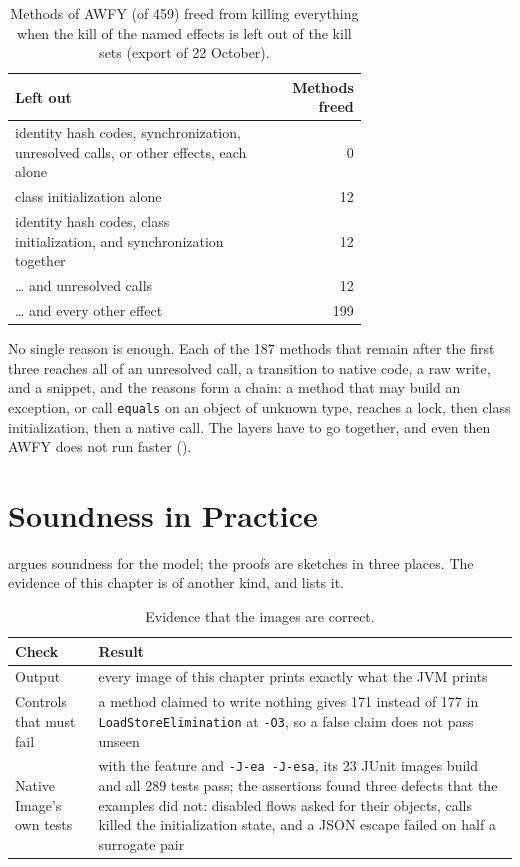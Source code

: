 \begin{table}[t]
    \centering
    \caption{Methods of AWFY (of 459) freed from killing everything when the kill of the named effects is left out of the
    kill sets (export of 22 October).}
    \label{tab:eval-blockers}
    \footnotesize
    \begin{tabular}{p{0.7\linewidth}r}
        \toprule
        Left out & Methods freed \\
        \midrule
        identity hash codes, synchronization, unresolved calls, or other effects, each alone & 0 \\
        class initialization alone & 12 \\
        identity hash codes, class initialization, and synchronization together & 12 \\
        \dots{} and unresolved calls & 12 \\
        \dots{} and every other effect & 199 \\
        \bottomrule
    \end{tabular}
\end{table}

No single reason is enough. Each of the 187 methods that remain after the first three reaches all of an unresolved call, a
transition to native code, a raw write, and a snippet, and the reasons form a chain: a method that may build an exception, or
call \texttt{equals} on an object of unknown type, reaches a lock, then class initialization, then a native call. The layers have
to go together, and even then AWFY does not run faster ().

\section{Soundness in Practice}\label{sec:eval-soundness}

 argues soundness for the model; the proofs are sketches in three places. The evidence of this chapter is of
another kind, and  lists it.

\begin{table}[t]
    \centering
    \caption{Evidence that the images are correct.}
    \label{tab:eval-checks}
    \footnotesize
    \begin{tabular}{p{3.2cm}p{9.0cm}}
        \toprule
        Check & Result \\
        \midrule
        Output                    & every image of this chapter prints exactly what the JVM prints \\
        Controls that must fail   & a method claimed to write nothing gives 171 instead of 177 in \texttt{LoadStoreElimination} at \texttt{-O3}, so a false claim does not pass unseen \\
        Native Image's own tests  & with the feature and \texttt{-J-ea -J-esa}, its 23 JUnit images build and all 289 tests pass; the assertions found three defects that the examples did not: disabled flows asked for their objects, calls killed the initialization state, and a JSON escape failed on half a surrogate pair \\
        \bottomrule
    \end{tabular}
\end{table}

